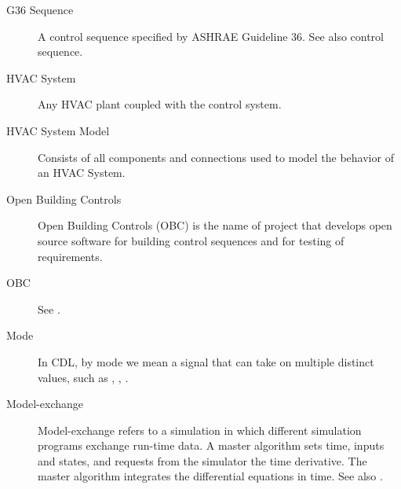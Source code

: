 \documentclass[letterpaper,10pt, openany,english]{sphinxmanual}
\begin{document}
\begin{description}
\item[{G36 Sequence\label{\detokenize{glossary:term-g36-sequence}}}] \leavevmode
A control sequence specified by ASHRAE Guideline 36. See also control sequence.

\item[{HVAC System\label{\detokenize{glossary:term-hvac-system}}}] \leavevmode
Any HVAC plant coupled with the control system.

\item[{HVAC System Model\label{\detokenize{glossary:term-hvac-system-model}}}] \leavevmode
Consists of all components and connections used to model the behavior of an HVAC System.

\item[{Open Building Controls\label{\detokenize{glossary:term-open-building-controls}}}] \leavevmode
Open Building Controls (OBC) is the name of project that develops
open source software for building control sequences and for testing
of requirements.

\item[{OBC\label{\detokenize{glossary:term-obc}}}] \leavevmode
See {\hyperref[\detokenize{glossary:term-open-building-controls}]{}}.

\item[{Mode\label{\detokenize{glossary:term-mode}}}] \leavevmode
In CDL, by mode we mean a signal that can take on multiple distinct
values, such as , , .

\item[{Model-exchange\label{\detokenize{glossary:term-model-exchange}}}] \leavevmode
Model-exchange refers to a simulation in which different simulation programs
exchange run-time data.
A master algorithm sets time, inputs and states, and requests
from the simulator the time derivative. The master algorithm
integrates the differential equations in time.
See also {\hyperref[\detokenize{glossary:term-co-simulation}]{}}.


\end{description}
\end{document}
